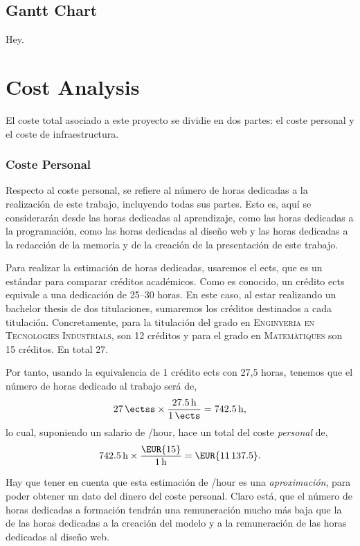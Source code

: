 \subsection{Gantt Chart}

Hey.


\section{Cost Analysis}\label{sec:cost}

El coste total asociado a este proyecto se dividie en dos partes: el coste
personal y el coste de infraestructura.

\subsubsection{Coste Personal}

Respecto al coste personal, se refiere al número de horas dedicadas a la
realización de este trabajo, incluyendo todas sus partes. Esto es, aquí se
considerarán desde las horas dedicadas al aprendizaje, como las horas dedicadas
a la programación, como las horas dedicadas al diseño web y las horas dedicadas
a la redacción de la memoria y de la creación de la presentación de este
trabajo.

Para realizar la estimación de horas dedicadas, usaremos el \gls{ects}, que es
un estándar para comparar créditos académicos. Como es conocido, un crédito
\gls{ects} equivale a una dedicación de 25--30 horas. En este caso, al estar
realizando un bachelor thesis de dos titulaciones, sumaremos los créditos
destinados a cada titulación. Concretamente, para la titulación del grado en
\textsc{Enginyeria en Tecnologies Industrials}, son 12 créditos y para el grado
en \textsc{Matemàtiques} son 15 créditos. En total \SI{27}{\ectss}.

Por tanto, usando la equivalencia de 1 crédito \gls{ects} con 27,5 horas,
tenemos que el número de horas dedicado al trabajo será de,
\begin{equation}
  \SI{27}{\ectss} \times \frac{\SI{27.5}{\hour}}{\SI{1}{\ects}} =
  \SI{742.5}{\hour},
\end{equation}
lo cual, suponiendo un salario de /hour, hace un total del coste
\emph{personal} de,
\begin{equation}
  \SI{742.5}{\hour} \times \frac{\text{\EUR{15}}}{\SI{1}{\hour}} =
  \text{\EUR{\num{11137.5}}}.
\end{equation}

\begin{remarkBox}
  Hay que tener en cuenta que esta estimación de /hour es una
  \emph{aproximación}, para poder obtener un dato del dinero del coste
  personal. Claro está, que el número de horas dedicadas a formación tendrán
  una remuneración mucho más baja que la de las horas dedicadas a la creación
  del modelo y a la remuneración de las horas dedicadas al diseño web.
\end{remarkBox}

